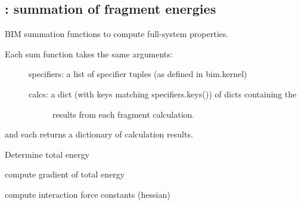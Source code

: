 \documentclass[letterpaper,10pt,english]{sphinxmanual}
\begin{document}
\subsection{: summation of fragment energies}
\label{\detokenize{bim:module-bim.sums}}\label{\detokenize{bim:sums-summation-of-fragment-energies}}
BIM summation functions to compute full-system properties.
\begin{description}
\item[{Each sum function takes the same arguments:}] \leavevmode
specifiers: a list of specifier tuples (as defined in bim.kernel)
\begin{description}
\item[{calcs: a dict (with keys matching specifiers.keys()) of dicts containing the}] \leavevmode
results from each fragment calculation.

\end{description}

\end{description}

and each returns a dictionary of calculation results.

\begin{fulllineitems}
\label{\detokenize{bim:bim.sums.energy_sum}}
Determine total energy

\end{fulllineitems}


\begin{fulllineitems}
\label{\detokenize{bim:bim.sums.gradient_sum}}
compute gradient of total energy

\end{fulllineitems}


\begin{fulllineitems}
\label{\detokenize{bim:bim.sums.hessian_sum}}
compute interaction force constants (hessian)

\end{fulllineitems}
\end{document}
